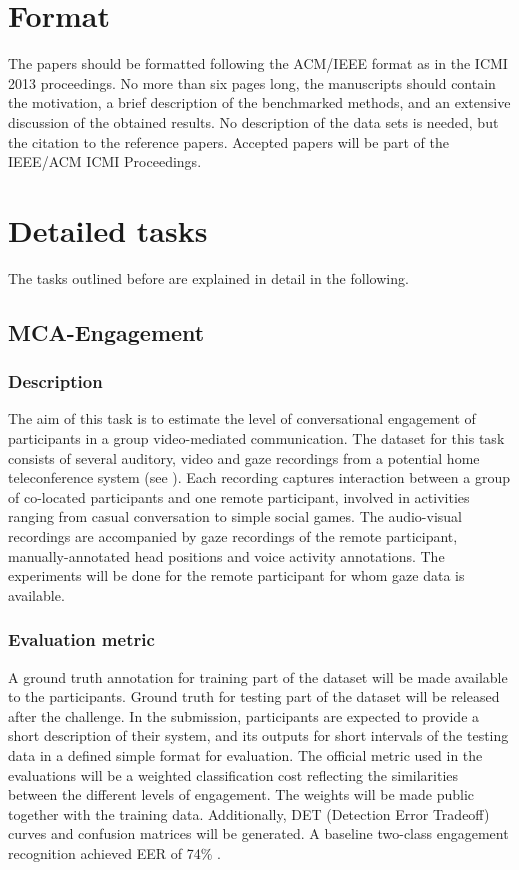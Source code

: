 \documentclass[a4paper]{article}
\begin{document}
\section*{Format}
The papers should be formatted following the ACM/IEEE format as in the ICMI 2013 proceedings. No more than six pages
long, the manuscripts should contain the motivation, a brief description of the benchmarked methods, and an extensive
discussion of the obtained results. No description of the data sets is needed, but the citation to the reference papers.
Accepted papers will be part of the IEEE/ACM ICMI Proceedings.

\section*{Detailed tasks}
The tasks outlined before are explained in detail in the following.

\subsection*{MCA-Engagement}
\subsubsection*{Description}
The aim of this task is to estimate the level of conversational engagement of participants in a group video-mediated
communication. The dataset for this task consists of several auditory, video and gaze recordings from a potential home
teleconference system (see \cite{TA2Web,Hadris12}). Each recording captures interaction between a group of co-located
participants and one remote participant, involved in activities ranging from casual conversation to simple social games.
The audio-visual recordings are accompanied by gaze recordings of the remote participant, manually-annotated head
positions and voice activity annotations. The experiments will be done for the remote participant for whom gaze data is
available.
\subsubsection*{Evaluation metric}
A ground truth annotation for training part of the dataset will be made available to the participants. Ground truth for
testing part of the dataset will be released after the challenge. In the submission, participants are expected to
provide a short description of their system, and its outputs for short intervals of the testing data in a defined simple
format for evaluation. The official metric used in the evaluations will be a weighted classification cost reflecting the
similarities between the different levels of engagement. The weights will be made public together with the training
data. Additionally, DET (Detection Error Tradeoff) curves and confusion matrices will be generated. A baseline two-class
engagement recognition achieved EER of 74\% \cite{Bednarik}.
\end{document}
